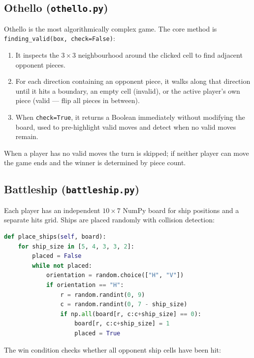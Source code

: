 \documentclass[12pt,a4paper]{article}
\begin{document}
\subsection{Othello (\texttt{othello.py})}

Othello is the most algorithmically complex game. The core method is
\texttt{finding\_valid(box, check=False)}:

\begin{enumerate}
    \item It inspects the $3{\times}3$ neighbourhood around the clicked cell to find adjacent
          opponent pieces.
    \item For each direction containing an opponent piece, it walks along that direction until
          it hits a boundary, an empty cell (invalid), or the active player's own piece
          (valid --- flip all pieces in between).
    \item When \texttt{check=True}, it returns a Boolean immediately without modifying the
          board, used to pre-highlight valid moves and detect when no valid moves remain.
\end{enumerate}

When a player has no valid moves the turn is skipped; if neither player can move the game ends
and the winner is determined by piece count.

\subsection{Battleship (\texttt{battleship.py})}

Each player has an independent $10{\times}7$ NumPy board for ship positions and a separate
hits grid. Ships are placed randomly with collision detection:

\begin{lstlisting}[language=Python, caption={Ship placement with collision detection}]
def place_ships(self, board):
    for ship_size in [5, 4, 3, 3, 2]:
        placed = False
        while not placed:
            orientation = random.choice(["H", "V"])
            if orientation == "H":
                r = random.randint(0, 9)
                c = random.randint(0, 7 - ship_size)
                if np.all(board[r, c:c+ship_size] == 0):
                    board[r, c:c+ship_size] = 1
                    placed = True
\end{lstlisting}

The win condition checks whether all opponent ship cells have been hit:
\end{document}
